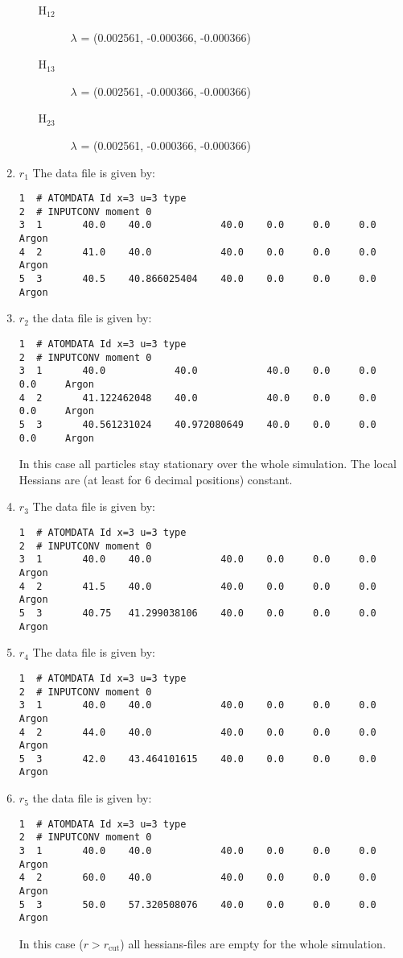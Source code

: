 \documentclass[a4paper]{article}
\begin{document}
\begin{enumerate}
\begin{enumerate}
\begin{description}
\item[{H$_{\text{12}}$}] $\lambda$ = (0.002561, -0.000366, -0.000366)
\item[{H$_{\text{13}}$}] $\lambda$ = (0.002561, -0.000366, -0.000366)
\item[{H$_{\text{23}}$}] $\lambda$ = (0.002561, -0.000366, -0.000366)
\end{description}
\end{enumerate}
\item \(r_1\)
\label{sec-1-5-1-4}
The data file is given by:
\begin{verbatim}
1  # ATOMDATA Id x=3 u=3 type
2  # INPUTCONV moment 0
3  1       40.0    40.0            40.0    0.0     0.0     0.0     Argon
4  2       41.0    40.0            40.0    0.0     0.0     0.0     Argon
5  3       40.5    40.866025404    40.0    0.0     0.0     0.0     Argon
\end{verbatim}
\item \(r_2\)
\label{sec-1-5-1-5}
the data file is given by:
\begin{verbatim}
1  # ATOMDATA Id x=3 u=3 type
2  # INPUTCONV moment 0
3  1       40.0            40.0            40.0    0.0     0.0     0.0     Argon
4  2       41.122462048    40.0            40.0    0.0     0.0     0.0     Argon
5  3       40.561231024    40.972080649    40.0    0.0     0.0     0.0     Argon
\end{verbatim}
In this case all particles stay stationary over the whole simulation. The local Hessians are (at least for 6 decimal positions) constant.
\item \(r_3\)
\label{sec-1-5-1-6}
The data file is given by:
\begin{verbatim}
1  # ATOMDATA Id x=3 u=3 type
2  # INPUTCONV moment 0
3  1       40.0    40.0            40.0    0.0     0.0     0.0     Argon
4  2       41.5    40.0            40.0    0.0     0.0     0.0     Argon
5  3       40.75   41.299038106    40.0    0.0     0.0     0.0     Argon
\end{verbatim}
\item \(r_4\)
\label{sec-1-5-1-7}
The data file is given by:
\begin{verbatim}
1  # ATOMDATA Id x=3 u=3 type
2  # INPUTCONV moment 0
3  1       40.0    40.0            40.0    0.0     0.0     0.0     Argon
4  2       44.0    40.0            40.0    0.0     0.0     0.0     Argon
5  3       42.0    43.464101615    40.0    0.0     0.0     0.0     Argon
\end{verbatim}
\item \(r_5\)
\label{sec-1-5-1-8}
the data file is given by:
\begin{verbatim}
1  # ATOMDATA Id x=3 u=3 type
2  # INPUTCONV moment 0
3  1       40.0    40.0            40.0    0.0     0.0     0.0     Argon
4  2       60.0    40.0            40.0    0.0     0.0     0.0     Argon
5  3       50.0    57.320508076    40.0    0.0     0.0     0.0     Argon
\end{verbatim}
In this case (\(r > r_{\textrm{cut}}\)) all hessians-files are empty for the whole simulation.
\end{enumerate}
\end{document}
